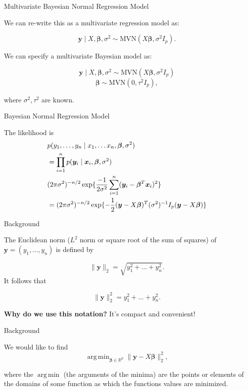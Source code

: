 \documentclass[
  ignorenonframetext,
]{beamer}
\newcommand{\bx}   {\bm{x}}
\newcommand{\by}   {\bm{y}}
\DeclareMathOperator*{\argmin}{arg\,min}
\newcommand{\R}{\mathbb{R}}
\newcommand{\bbeta}{\bm{\beta}}
\begin{document}
\begin{frame}{Multivariate Bayesian Normal Regression Model}
\protect\hypertarget{multivariate-bayesian-normal-regression-model}{}

We can re-write this as a multivariate regression model as:

\[\by \mid X,\bbeta, \sigma^2 \sim \text{MVN}( X\bbeta, \sigma^2 I_p).\]

We can specify a multivariate Bayesian model as:

\[\by \mid X,\bbeta, \sigma^2 \sim \text{MVN}( X\bbeta, \sigma^2 I_p)\]
\[\bbeta \sim \text{MVN}(0, \tau^2 I_p),\]

where \(\sigma^2, \tau^2\) are known.

\end{frame}

\begin{frame}{Bayesian Normal Regression Model}
\protect\hypertarget{bayesian-normal-regression-model}{}

The likelihood is \begin{align}
&p(y_1,\ldots,y_n \mid x_1,\ldots x_n, \bbeta, \sigma^2) \\
&= \prod_{i=1}^n p(\by_i \mid \bx_i, \bbeta, \sigma^2) \\
&(2\pi \sigma^2 )^{-n/2} \exp\{
\frac{-1}{2\sigma^2} \sum_{i=1}^n (\by_i - \bbeta^T \bx_i)^2
\}\\
&= (2\pi \sigma^2 )^{-n/2} \exp\{\textcolor{black}{-\frac{1}{2}} (\by - X\bbeta)^T\textcolor{black}{(\sigma^2)^{-1} I_p}(\by - X\bbeta)\}
\end{align}

\end{frame}

\begin{frame}{Background}
\protect\hypertarget{background}{}

The Euclidean norm (\(L^2\) norm or square root of the sum of squares)
of \(\boldsymbol{y} = (y_1, \ldots, y_n)\) is defined by

\[ \|\boldsymbol{y}\|_2 = \sqrt{y_1^2 + \ldots + y_n^2}.\] It follows
that

\[ \|\boldsymbol{y}\|_2^2 = y_1^2 + \ldots + y_n^2.\] \vspace*{1em}

\textbf{Why do we use this notation?} It's compact and convenient!

\end{frame}

\begin{frame}{Background}
\protect\hypertarget{background-1}{}

We would like to find \[\argmin_{\bbeta \in \R^p} \|\by-X\bbeta\|_2^2,\]

where the \(\argmin\) (the arguments of the minima) are the points or
elements of the domains of some function as which the functions values
are minimized.

\end{frame}
\end{document}
